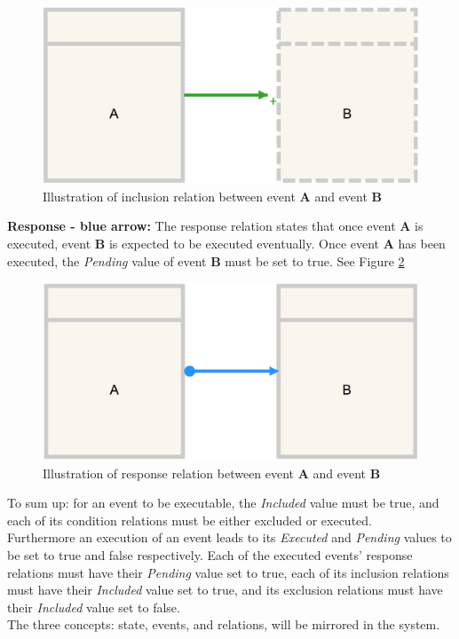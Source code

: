 \begin{figure}[h!]
\centering
\includegraphics[width=0.5\linewidth]{Figures/inclusion}
\caption{\label{fig:InclusionRelation} Illustration of inclusion relation between event \textbf{A} and event \textbf{B}}
\end{figure} 


\textbf{Response - blue arrow:} The response relation states that once event \textbf{A} is executed, event \textbf{B} is expected to be executed eventually. Once event \textbf{A} has been executed, the \textit{Pending} value of event \textbf{B} must be set to true. See Figure \ref{fig:ResponseRelation}

\begin{figure}[h!]
\centering
\includegraphics[width=0.5\linewidth]{Figures/response}
\caption{\label{fig:ResponseRelation} Illustration of response relation between event \textbf{A} and event \textbf{B}}
\end{figure} 

To sum up: for an event to be executable, the \textit{Included} value must be true, and each of its condition relations must be either excluded or executed. \\

Furthermore an execution of an event leads to its \textit{Executed} and \textit{Pending} values to be set to true and false respectively. Each of the executed events’ response relations must have their \textit{Pending} value set to true, each of its inclusion relations must have their \textit{Included} value set to true, and its exclusion relations must have their \textit{Included} value set to false. \\

The three concepts: state, events, and relations, will be mirrored in the system.